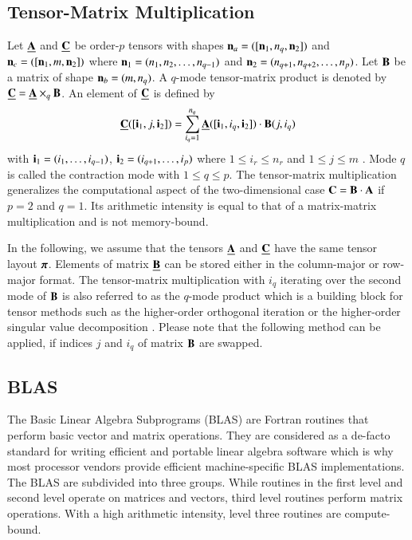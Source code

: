 \subsection{Tensor-Matrix Multiplication}
Let $\underline{\mathbf{A}}$ and $\underline{\mathbf{C}}$ be order-$p$ tensors with shapes $\mathbf{n}_a = ([\mathbf{n}_1,n_q,\mathbf{n}_2])$ and $\mathbf{n}_c =([\mathbf{n}_1,m,\mathbf{n}_2])$ where $\mathbf{n}_1 = (n_1,n_2,\allowbreak\dots,n_{q-1})$ and $\mathbf{n}_2 = (n_{q+1},n_{q+2},\allowbreak\dots,n_p)$.
Let $\mathbf{B}$ be a matrix of shape $\mathbf{n}_b = (m,n_q)$.
A $q$-mode tensor-matrix product is denoted by $\underline{\mathbf{C}} = \underline{\mathbf{A}} \times_q \mathbf{B}$. 
An element of $\underline{\mathbf{C}}$ is defined by
\begin{equation}
\label{equ:tensor.matrix.multplication}
\underline{\mathbf{C}}([\mathbf{i}_1, j, \mathbf{i}_2]) = \sum_{i_q=1}^{n_q} \underline{\mathbf{A}}([\mathbf{i}_1, i_q, \mathbf{i}_2]) \cdot \mathbf{B}(j,i_q)
\end{equation}
with $\mathbf{i}_1 = (i_1,\dots,i_{q-1})$, $\mathbf{i}_2 = (i_{q+1},\dots,i_p)$ where $1 \leq i_r \leq n_r$ and $1 \leq j \leq m$ \cite{li:2015:input, kolda:2009:decompositions}.
Mode $q$ is called the contraction mode with $1 \leq q \leq p$.
The tensor-matrix multiplication generalizes the computational aspect of the two-dimensional case $\mathbf{C} = \mathbf{B} \cdot \mathbf{A}$ if $p=2$ and $q=1$.
Its arithmetic intensity is equal to that of a matrix-matrix multiplication and is not memory-bound.

In the following, we assume that the tensors $\underline{\mathbf{A}}$ and $\underline{\mathbf{C}}$ have the same tensor layout $\boldsymbol{\pi}$. 
Elements of matrix $\underline{\mathbf{B}}$ can be stored either in the column-major or row-major format.
The tensor-matrix multiplication with $i_q$ iterating over the second mode of $\mathbf{B}$ is also referred to as the $q$-mode product which is a building block for tensor methods such as the higher-order orthogonal iteration or the higher-order singular value decomposition \cite{kolda:2009:decompositions}.
Please note that the following method can be applied, if indices $j$ and $i_q$ of matrix $\mathbf{B}$ are swapped.


\subsection{BLAS}
The Basic Linear Algebra Subprograms (BLAS) are Fortran routines that perform basic vector and matrix operations.
They are considered as a de-facto standard for writing efficient and portable linear algebra software which is why most processor vendors provide efficient machine-specific BLAS implementations.
The BLAS are subdivided into three groups.
While routines in the first level and second level operate on matrices and vectors, third level routines perform matrix operations.
With a high arithmetic intensity, level three routines are compute-bound.

